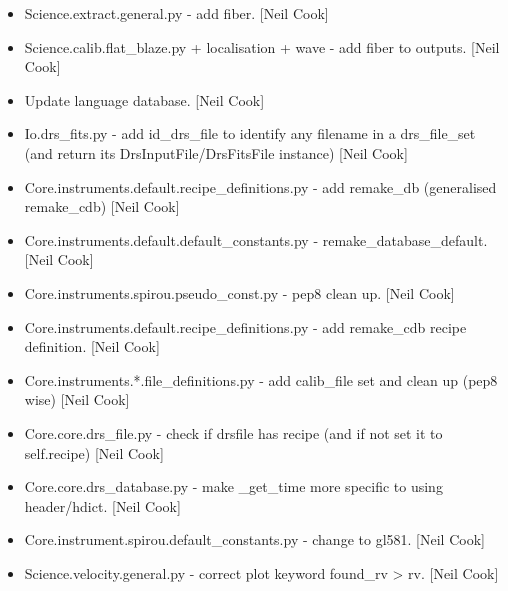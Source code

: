 \documentclass[a4paper,10pt,english]{report}
\begin{document}
\begin{itemize}
\item {} 
Science.extract.general.py - add fiber. {[}Neil Cook{]}

\item {} 
Science.calib.flat\_blaze.py + localisation + wave - add fiber to
outputs. {[}Neil Cook{]}

\item {} 
Update language database. {[}Neil Cook{]}

\item {} 
Io.drs\_fits.py - add id\_drs\_file to identify any filename in a
drs\_file\_set (and return its DrsInputFile/DrsFitsFile instance) {[}Neil
Cook{]}

\item {} 
Core.instruments.default.recipe\_definitions.py - add remake\_db
(generalised remake\_cdb) {[}Neil Cook{]}

\item {} 
Core.instruments.default.default\_constants.py -
remake\_database\_default. {[}Neil Cook{]}

\item {} 
Core.instruments.spirou.pseudo\_const.py - pep8 clean up. {[}Neil Cook{]}

\item {} 
Core.instruments.default.recipe\_definitions.py - add remake\_cdb recipe
definition. {[}Neil Cook{]}

\item {} 
Core.instruments.*.file\_definitions.py - add calib\_file set and clean
up (pep8 wise) {[}Neil Cook{]}

\item {} 
Core.core.drs\_file.py - check if drsfile has recipe (and if not set it
to self.recipe) {[}Neil Cook{]}

\item {} 
Core.core.drs\_database.py - make \_get\_time more specific to using
header/hdict. {[}Neil Cook{]}

\item {} 
Core.instrument.spirou.default\_constants.py - change to gl581. {[}Neil
Cook{]}

\item {} 
Science.velocity.general.py - correct plot keyword found\_rv \textendash{}\textgreater{} rv.
{[}Neil Cook{]}

\end{itemize}
\end{document}
